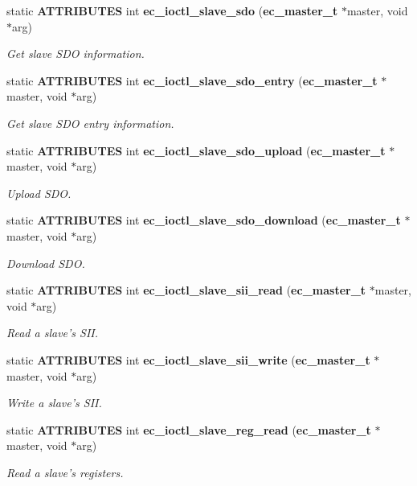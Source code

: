 \begin{DoxyCompactItemize}
static {\bf A\-T\-T\-R\-I\-B\-U\-T\-E\-S} int {\bf ec\-\_\-ioctl\-\_\-slave\-\_\-sdo} ({\bf ec\-\_\-master\-\_\-t} $\ast$master, void $\ast$arg)
\begin{DoxyCompactList}\small\item\em Get slave S\-D\-O information. \end{DoxyCompactList}\item 
static {\bf A\-T\-T\-R\-I\-B\-U\-T\-E\-S} int {\bf ec\-\_\-ioctl\-\_\-slave\-\_\-sdo\-\_\-entry} ({\bf ec\-\_\-master\-\_\-t} $\ast$master, void $\ast$arg)
\begin{DoxyCompactList}\small\item\em Get slave S\-D\-O entry information. \end{DoxyCompactList}\item 
static {\bf A\-T\-T\-R\-I\-B\-U\-T\-E\-S} int {\bf ec\-\_\-ioctl\-\_\-slave\-\_\-sdo\-\_\-upload} ({\bf ec\-\_\-master\-\_\-t} $\ast$master, void $\ast$arg)
\begin{DoxyCompactList}\small\item\em Upload S\-D\-O. \end{DoxyCompactList}\item 
static {\bf A\-T\-T\-R\-I\-B\-U\-T\-E\-S} int {\bf ec\-\_\-ioctl\-\_\-slave\-\_\-sdo\-\_\-download} ({\bf ec\-\_\-master\-\_\-t} $\ast$master, void $\ast$arg)
\begin{DoxyCompactList}\small\item\em Download S\-D\-O. \end{DoxyCompactList}\item 
static {\bf A\-T\-T\-R\-I\-B\-U\-T\-E\-S} int {\bf ec\-\_\-ioctl\-\_\-slave\-\_\-sii\-\_\-read} ({\bf ec\-\_\-master\-\_\-t} $\ast$master, void $\ast$arg)
\begin{DoxyCompactList}\small\item\em Read a slave's S\-I\-I. \end{DoxyCompactList}\item 
static {\bf A\-T\-T\-R\-I\-B\-U\-T\-E\-S} int {\bf ec\-\_\-ioctl\-\_\-slave\-\_\-sii\-\_\-write} ({\bf ec\-\_\-master\-\_\-t} $\ast$master, void $\ast$arg)
\begin{DoxyCompactList}\small\item\em Write a slave's S\-I\-I. \end{DoxyCompactList}\item 
static {\bf A\-T\-T\-R\-I\-B\-U\-T\-E\-S} int {\bf ec\-\_\-ioctl\-\_\-slave\-\_\-reg\-\_\-read} ({\bf ec\-\_\-master\-\_\-t} $\ast$master, void $\ast$arg)
\begin{DoxyCompactList}\small\item\em Read a slave's registers. \end{DoxyCompactList}\item 

\end{DoxyCompactItemize}
